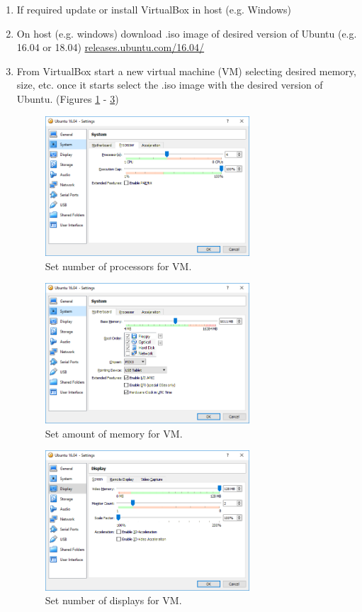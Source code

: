 \documentclass{scrartcl}
\begin{document}
\begin{enumerate}
	\item If required update or install VirtualBox in host  (e.g. Windows)
	\item On host (e.g. windows) download .iso image of desired version of Ubuntu (e.g. 16.04 or 18.04) \href{http://releases.ubuntu.com/16.04/}{releases.ubuntu.com/16.04/}
	\item From VirtualBox start a new virtual machine (VM) selecting desired memory, size, etc. once it starts select the .iso image with the desired version of Ubuntu. (Figures \ref{fig:Processor} - \ref{fig:Display})
	
	\begin{figure}[p]
		\centering
		\includegraphics[width=3.0in]{Processor.png}
		\caption{Set number of processors for VM.}
		\label{fig:Processor}
	\end{figure}
	
	\begin{figure}[p]
		\centering
		\includegraphics[width=3.0in]{Memory.png}
		\caption{Set amount of memory for VM.}
		\label{fig:Memory}
	\end{figure}

	\begin{figure}[p]
		\centering
		\includegraphics[width=3.0in]{Display.png}
		\caption{Set number of displays for VM.}
		\label{fig:Display}
	\end{figure}
	

\end{enumerate}
\end{document}
